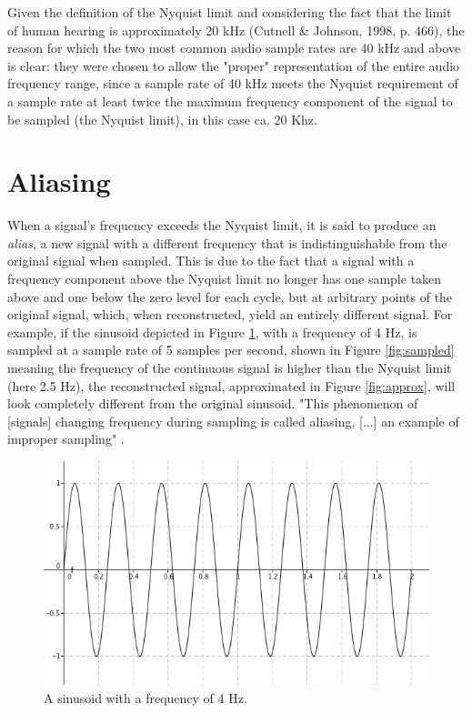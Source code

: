 \documentclass[12pt,twoside]{report}
\begin{document}
\noindent Given the definition of the Nyquist limit and considering the fact that the limit of human hearing is approximately 20 kHz (Cutnell \& Johnson, 1998, p. 466), the reason for which the two most common audio sample rates are 40 kHz and above is clear: they were chosen to allow the "proper" representation of the entire audio frequency range, since a sample rate of 40 kHz meets the Nyquist requirement of a sample rate at least twice the maximum frequency component of the signal to be sampled (the Nyquist limit), in this case ca. 20 Khz.

\section{Aliasing}

When a signal's frequency exceeds the Nyquist limit, it is said to produce an \emph{alias}, a new signal with a different frequency that is indistinguishable from the original signal when sampled. This is due to the fact that a signal with a frequency component above the Nyquist limit no longer has one sample taken above and one below the zero level for each cycle, but at arbitrary points of the original signal, which, when reconstructed, yield an entirely different signal. For example, if the sinusoid depicted in Figure \ref{fig:orig}, with a frequency of 4 Hz, is sampled at a sample rate of 5 samples per second, shown in Figure \ref{fig:sampled} meaning the frequency of the continuous signal is higher than the Nyquist limit (here 2.5 Hz), the reconstructed signal, approximated in Figure \ref{fig:approx}, will look completely different from the original sinusoid. "This phenomenon of [signals] changing frequency during sampling is called aliasing, [...] an example of improper sampling" .

\begin{figure}[b!]

  \centering

  \includegraphics[scale=0.5]{img/orig}

  \caption{A sinusoid with a frequency of 4 Hz.}

  \label{fig:orig}

\end{figure}
\end{document}

